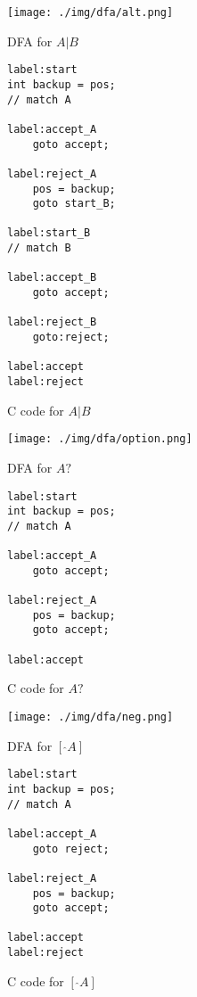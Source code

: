 \documentclass[11pt,a4paper]{report}
\newcommand{\regexp}[1]{$#1$}
\begin{document}
\begin{figure}[h!]
	\begin{subfigure}[h]{0.45\textwidth}
		\centering
		\texttt{[image: ./img/dfa/alt.png]}
		\caption{DFA for \regexp{A|B}}
	\end{subfigure}
	\hspace{0.05\textwidth}
	\begin{subfigure}[h]{0.45\textwidth}
		\centering
		\begin{lstlisting}[style=C]
label:start
int backup = pos;
// match A

label:accept_A
	goto accept;

label:reject_A
	pos = backup;
	goto start_B;

label:start_B
// match B

label:accept_B
	goto accept;

label:reject_B
	goto:reject;

label:accept
label:reject
		\end{lstlisting}
		\caption{C code for \regexp{A|B}}
	\end{subfigure}
	\caption{}
	\label{dfatoc-alt}
\end{figure}

\begin{figure}[h!]
	\begin{subfigure}[h]{0.45\textwidth}
		\centering
		\texttt{[image: ./img/dfa/option.png]}
		\caption{DFA for \regexp{A?}}
	\end{subfigure}
	\hspace{0.05\textwidth}
	\begin{subfigure}[h]{0.45\textwidth}
		\centering
		\begin{lstlisting}[style=C]
label:start
int backup = pos;
// match A

label:accept_A
	goto accept;

label:reject_A
	pos = backup;
	goto accept;

label:accept
		\end{lstlisting}
		\caption{C code for \regexp{A?}}
	\end{subfigure}
	\caption{}
\end{figure}

\begin{figure}[h!]
	\begin{subfigure}[h]{0.45\textwidth}
		\centering
		\texttt{[image: ./img/dfa/neg.png]}
		\caption{DFA for \regexp{[\ \hat{} A]}}
	\end{subfigure}
	\hspace{0.05\textwidth}
	\begin{subfigure}[h]{0.45\textwidth}
		\centering
		\begin{lstlisting}[style=C]
label:start
int backup = pos;
// match A

label:accept_A
	goto reject;

label:reject_A
	pos = backup;
	goto accept;

label:accept
label:reject
		\end{lstlisting}
		\caption{C code for \regexp{[\ \hat{} A]}}
	\end{subfigure}
	\caption{}
\end{figure}
\end{document}
